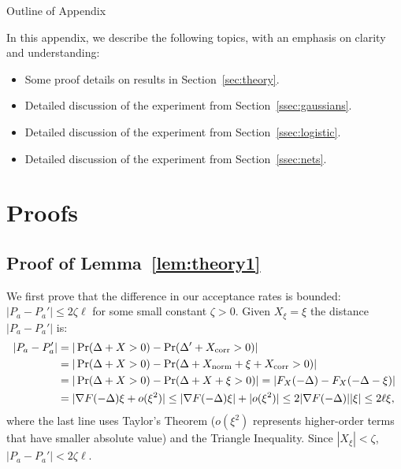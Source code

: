 \documentclass{article}
\begin{document}
\small


\normalsize

\clearpage
\appendix

\begin{center}
{\Large Outline of Appendix}
\end{center}

In this appendix, we describe the following topics, with an emphasis on clarity and understanding:

\begin{itemize}[noitemsep]
    \item Some proof details on results in Section~\ref{sec:theory}.
    \item Detailed discussion of the experiment from Section~\ref{ssec:gaussians}.
    \item Detailed discussion of the experiment from Section~\ref{ssec:logistic}.
    \item Detailed discussion of the experiment from Section~\ref{ssec:nets}.
\end{itemize}

\section{Proofs}\label{app:proofs}

\subsection{Proof of Lemma~\ref{lem:theory1}}\label{app:theory1}

We first prove that the difference in our acceptance rates is bounded: $|P_a - P_a'| \leq 2\zeta
\ell$ for some small constant $\zeta > 0$. Given $X_\xi = \xi$ the distance $|P_a - P_a'|$ is:
\begin{align*}
|P_a - P_a'| &= |\Pr(\Delta + X >0) - \Pr(\Delta' + X_{\rm corr} > 0)|\\
& = | \Pr (\Delta + X > 0) - \Pr (\Delta + X_{\rm norm} + \xi + X_{\rm corr} >0) |    \\
&= |\Pr (\Delta + X > 0) -\Pr(\Delta + X + \xi >0)| = |F_X(-\Delta)- F_X(-\Delta - \xi)| \\
&= |\nabla F(-\Delta) \xi + o(\xi^2)| \leq  |\nabla F(-\Delta) \xi| +| o(\xi^2)| \leq 2|\nabla F(-\Delta)| |\xi| \leq 2\ell \xi,
\end{align*}
where the last line uses Taylor's Theorem ($o(\xi^2)$ represents higher-order terms that have
smaller absolute value) and the Triangle Inequality.  Since $|X_\xi| < \zeta$, $|P_a - P_a'| <
2 \zeta \ell$.
\end{document}
